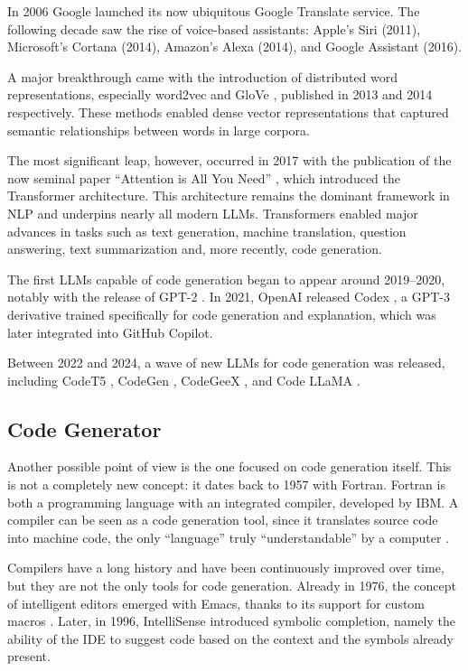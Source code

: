 In 2006 Google launched its now ubiquitous Google 
Translate service. The following decade saw the rise of voice-based 
assistants: Apple’s Siri (2011), Microsoft’s Cortana (2014), 
Amazon’s Alexa (2014), and Google Assistant (2016).

A major breakthrough came with the introduction of distributed word 
representations, especially word2vec \cite{mikolov2013efficient} and 
GloVe \cite{pennington2014glove}, published in 2013 and 2014 respectively. 
These methods enabled dense vector representations that captured semantic 
relationships between words in large corpora.

The most significant leap, however, occurred in 2017 with the publication 
of the now seminal paper “Attention is All You Need” 
\cite{vaswani2017attention}, which introduced the Transformer 
architecture. This architecture remains the dominant framework in 
NLP and underpins nearly all modern LLMs. Transformers enabled major 
advances in tasks such as text generation, machine translation, 
question answering, text summarization and, more recently, code 
generation.

The first LLMs capable of code generation began to appear around 
2019–2020, notably with the release of GPT-2 \cite{radford2019language}. 
In 2021, OpenAI released Codex \cite{chen2021codex}, a GPT-3 \cite{brown2020language} derivative 
trained specifically for code generation and explanation, which was
later integrated into GitHub Copilot.

Between 2022 and 2024, a wave of new LLMs for code generation was 
released, including CodeT5 \cite{wang2021codet5}, CodeGen 
\cite{nijkamp2022codegen}, CodeGeeX \cite{zeng2022codegeex}, 
and Code LLaMA \cite{roziere2023code}.


\subsection{Code Generator} %
\label{sec:Code_Generator}
Another possible point of view is the one focused on code 
generation itself. This is not a  completely new concept: 
it dates back to 1957 with Fortran. Fortran is both a 
programming language with an integrated compiler, developed by IBM. 
A compiler can be seen as a code generation tool, since it 
translates source code into machine code, the only “language” 
truly “understandable” by a computer \cite{backus1957fortran}.

Compilers have a long history and have been continuously 
improved over time, but they are not the only tools for code 
generation. Already in 1976, the concept of intelligent editors 
emerged with Emacs, thanks to its support for custom macros 
\cite{stallman1981emacs}. Later, in 1996, IntelliSense 
introduced symbolic completion, namely the ability of the IDE 
to suggest code based on the context and the symbols already present.


